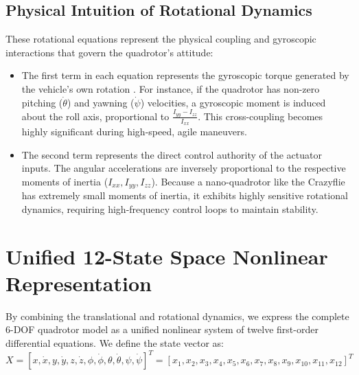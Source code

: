 \subsection{Physical Intuition of Rotational Dynamics}
These rotational equations represent the physical coupling and gyroscopic interactions that govern the quadrotor's attitude:
\begin{itemize}
    \item The first term in each equation represents the gyroscopic torque generated by the vehicle's own rotation \cite{ref_57}. For instance, if the quadrotor has non-zero pitching ($\dot{\theta}$) and yawning ($\dot{\psi}$) velocities, a gyroscopic moment is induced about the roll axis, proportional to $\frac{I_{yy}-I_{zz}}{I_{xx}}$. This cross-coupling becomes highly significant during high-speed, agile maneuvers.
    \item The second term represents the direct control authority of the actuator inputs. The angular accelerations are inversely proportional to the respective moments of inertia ($I_{xx}, I_{yy}, I_{zz}$). Because a nano-quadrotor like the Crazyflie has extremely small moments of inertia, it exhibits highly sensitive rotational dynamics, requiring high-frequency control loops to maintain stability.
\end{itemize}

\section{Unified 12-State Space Nonlinear Representation}
By combining the translational and rotational dynamics, we express the complete 6-DOF quadrotor model as a unified nonlinear system of twelve first-order differential equations. We define the state vector as:
\begin{equation}
X = [x, \dot{x}, y, \dot{y}, z, \dot{z}, \phi, \dot{\phi}, \theta, \dot{\theta}, \psi, \dot{\psi}]^T = [x_1, x_2, x_3, x_4, x_5, x_6, x_7, x_8, x_9, x_10, x_{11}, x_{12}]^T
\end{equation}

